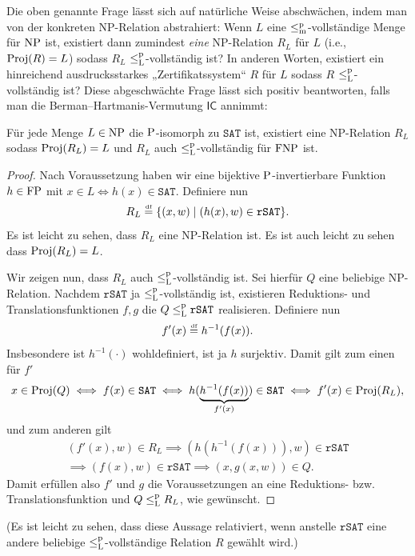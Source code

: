 Die oben genannte Frage lässt sich auf natürliche Weise abschwächen, indem man von der konkreten NP-Relation abstrahiert: Wenn $L$ eine $\leqmp$-vollständige Menge für $\NP$ ist, existiert dann zumindest \emph{eine} NP-Relation $R_L$ für $L$ (i.e., $\Proj(R)=L$) sodass $R_L$ $\leqlp$-vollständig ist? In anderen Worten, existiert ein hinreichend ausdrucksstarkes „Zertifikatssystem“ $R$ für $L$ sodass $R$ $\leqlp$-vollständig ist?
Diese abgeschwächte Frage lässt sich positiv beantworten, falls man die Berman–Hartmanis-Vermutung $\mathsf{IC}$ annimmt:
\begin{observation}\label{obs:isomorphs-sind-leqlp-vollst}
    Für jede Menge $L\in \NP$ die $\P$-isomorph zu $\mathtt{SAT}$ ist, existiert eine NP-Relation $R_L$ sodass $\Proj(R_L)=L$ und $R_L$ auch $\leqlp$-vollständig für $\FNP$ ist.
\end{observation}
\begin{proof}
    Nach Voraussetzung haben wir eine bijektive $\P$-invertierbare Funktion $h\in\FP$ mit $x\in L \iff h(x) \in \mathtt{SAT}$.
    Definiere nun
    \[ R_L \defeq \{ (x,w) \mid (h(x), w)\in \mathtt{rSAT}\}. \]
    Es ist leicht zu sehen, dass $R_L$ eine NP-Relation ist. Es ist auch leicht zu sehen dass $\Proj(R_L)=L$.

    Wir zeigen nun, dass $R_L$ auch $\leqlp$-vollständig ist. Sei hierfür $Q$ eine beliebige NP-Relation. Nachdem $\mathtt{rSAT}$ ja $\leqlp$-vollständig ist, existieren Reduktions- und Translationsfunktionen $f,g$ die $Q\leqlp \mathtt{rSAT}$ realisieren.
    Definiere nun
    \[ f'(x) \defeq h^{-1}(f(x)). \]
    Insbesondere ist $h^{-1}(\cdot)$ wohldefiniert, ist ja $h$ surjektiv.
    Damit gilt zum einen für $f'$
    \[ x\in \Proj(Q) \iff f(x) \in \mathtt{SAT} \iff h(\underbrace{h^{-1}(f(x))}_{f'(x)}) \in \mathtt{SAT} \iff f'(x) \in \Proj(R_L), \]
    und zum anderen gilt
    \begin{gather*} (f'(x), w) \in R_L \implies (h(h^{-1}(f(x))), w)\in \mathtt{rSAT} \\\implies (f(x), w)\in \mathtt{rSAT} \implies (x, g(x, w))\in Q.  \end{gather*}
    Damit erfüllen also $f'$ und $g$ die Voraussetzungen an eine Reduktions- bzw. Translationsfunktion und $Q\leqlp R_L$, wie gewünscht.
\end{proof}
(Es ist leicht zu sehen, dass diese Aussage relativiert, wenn anstelle $\mathtt{rSAT}$ eine andere beliebige $\leqlp$-vollständige Relation $R$ gewählt wird.)


